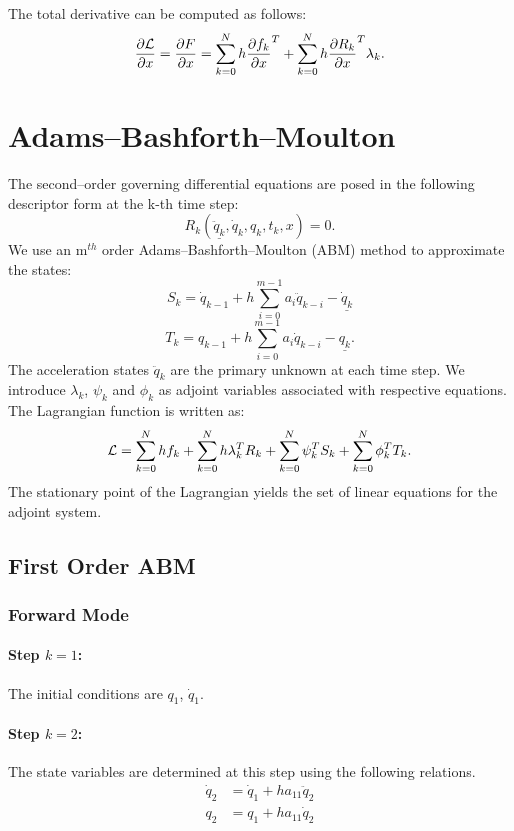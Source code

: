 \documentclass[10pt,letter]{book}
\newcommand{\pd}[2]{\dfrac{\partial #1}{\partial #2}}
\begin{document}
     The total derivative can be computed as follows:
     $$\pd{\cal{L}}{x} = \pd{F}{x} = \sum_{k=0}^N h \pd{f_k}{x}^T + \sum_{k=0}^N h
     \pd{R_k}{x}^T \lambda_k.$$

     \section{Adams--Bashforth--Moulton}

     The second--order governing differential equations are posed in the following
     descriptor form at the k-th time step:
     $$ R_k(\underline{\ddot{q}_k}, \dot{q}_k, q_k, t_k , x) = 0.$$
     We use an m$^{th}$ order Adams--Bashforth--Moulton (ABM) method to approximate the states:
     $$ S_k =   \dot{q}_{k-1}  + h \sum_{i=0}^{m-1} a_i \ddot{q}_{k-i} - \underline{\dot{q}_k} $$ 
     $$ T_k =   {q}_{k-1}  + h \sum_{i=0}^{m-1} a_i \dot{q}_{k-i} - \underline{{q}_k} .$$
     The acceleration states $\ddot{q}_k$ are the primary unknown at each time step. We introduce $\lambda_k$, $\psi_k$ and $\phi_k$ as adjoint variables
     associated with respective equations. The Lagrangian function is written
     as:
     $${\cal{L}} = \sum_{k=0}^N h f_k + \sum_{k=0}^N h \lambda_k^T
     R_k + \sum_{k=0}^N \psi_k^T S_k + \sum_{k=0}^N \phi_k^T T_k. $$
     The stationary point of the Lagrangian yields the set of linear
     equations for the adjoint system.

     \subsection{First Order ABM}

     \subsubsection{Forward Mode}

     \paragraph{Step $k=1$:}
     The initial conditions are $q_1$, $\dot{q}_1$.
     
     \paragraph{Step $k=2$:}
     The state variables are determined at this step using the
     following relations.
     \begin{equation}\nonumber
       \begin{split}
         \dot{q}_{2} &= \dot{q}_1 + h a_{11} \ddot{q}_{2}  \\
         q_{2}       &= q_1 + h a_{11} \dot{q}_{2}
       \end{split}
     \end{equation}
\end{document}
